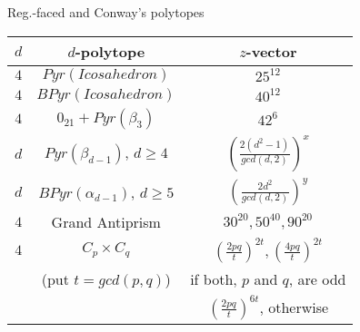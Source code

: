 \documentclass[%
pdf,
colorBG,
slideColor,
]{prosper}
\begin{document}
\begin{slide}{Reg.-faced and Conway's polytopes}


\begin{center}
{\scriptsize
\begin{tabular}{||c|c|c||}
\hline
$d$&$d$-polytope                        & $z$-vector\\
\hline
$4$&$Pyr(Icosahedron)$             &$25^{12}$\\
$4$&$BPyr(Icosahedron)$            &$40^{12}$\\
$4$&$0_{21}+Pyr(\beta_3)$          &$42^6$\\
$d$&$Pyr(\beta_{d-1})$, $d\geq 4$  &$(\frac{2(d^2-1)}{gcd(d,2)})^{x}$\\
$d$&$BPyr(\alpha_{d-1})$, $d\geq 5$&$(\frac{2d^2}{gcd(d,2)})^{y}$\\
\hline
$4$&Grand Antiprism                &$30^{20}, 50^{40}, 90^{20}$\\
$4$&$C_p\times C_q$                &$(\frac{2pq}{t})^{2t}, (\frac{4pq}{t})^{2t}$\\
&(put $t=gcd(p,q)$)                &if both, $p$ and $q$, are odd\\
&                                   &$(\frac{2pq}{t})^{6t}$, otherwise\\
\hline
\hline
\end{tabular}
}
\end{center}


\end{slide}
\end{document}
